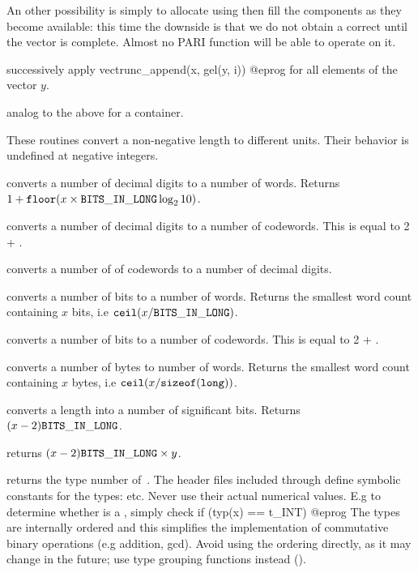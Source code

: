 An other possibility is simply to allocate using  then fill
the components as they become available: this time the downside is that we do
not obtain a correct  until the vector is complete. Almost no PARI
function will be able to operate on it.

 successively apply
\bprog
  vectrunc_append(x, gel(y, i))
@eprog
for all elements of the vector $y$.


 analog to the above for a
 container.


These routines convert a non-negative length to different units. Their
behavior is undefined at negative integers.

 converts a number of decimal digits to a number
of words. Returns $ 1 + {\tt floor}(x \times {\tt BITS\_IN\_LONG} \log_2 10)$.

 converts a number of decimal digits to a number
of codewords. This is equal to 2 + .

 converts a number of of codewords to a
number of decimal digits.

 converts a number of bits to a number of
words. Returns the smallest word count containing $x$ bits, i.e $
{\tt ceil}(x / {\tt BITS\_IN\_LONG})$.

 converts a number of bits to a number of
codewords. This is equal to 2 + .

 converts a number of bytes to number of
words. Returns the smallest word count containing $x$ bytes, i.e
${\tt ceil}(x / {\tt sizeof(long)})$.

 converts a  length into a number
of significant bits. Returns $(x - 2){\tt BITS\_IN\_LONG}$.

 returns $(x - 2){\tt BITS\_IN\_LONG} \times y$.


 returns the type number of~. The header files
included through  define symbolic constants for the 
types:  etc. Never use their actual numerical values. E.g to determine
whether  is a , simply check
\bprog
  if (typ(x) == t_INT) { }
@eprog\noindent
The types are internally ordered and this simplifies the implementation of
commutative binary operations (e.g addition, gcd). Avoid using the ordering
directly, as it may change in the future; use type grouping functions
instead ().


